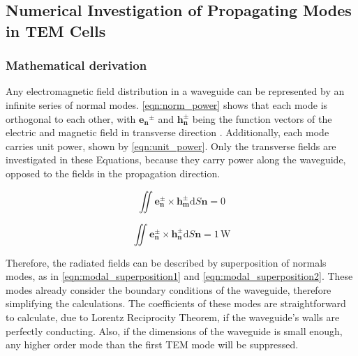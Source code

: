 \subsection{Numerical Investigation of Propagating Modes in TEM Cells}\label{sec:modes_tem_cell}
\subsubsection{Mathematical derivation}



Any electromagnetic field distribution in a waveguide can be represented by an infinite series of normal modes. \autoref{eqn:norm_power} shows that each mode is orthogonal to each other, with $\mathbf{e_n}^\pm$ and $\mathbf{h_n^\pm}$ being the function vectors of the electric and magnetic field in transverse direction \cite{Collin_2015}. Additionally, each mode carries unit power, shown by \autoref{eqn:unit_power}. Only the transverse fields are investigated in these Equations, because they carry power along the waveguide, opposed to the fields in the propagation direction.

\begin{equation}
    \iint \mathbf{e_n^\pm}\times \mathbf{h_m^\pm}\mathrm{d}S\mathbf{n}=0
    \label{eqn:norm_power}
\end{equation}

\begin{equation}
    \iint \mathbf{e_n^\pm}\times \mathbf{h_n^\pm}\mathrm{d}S\mathbf{n}=1\,\mathrm{W}
    \label{eqn:unit_power}
\end{equation}

Therefore, the radiated fields can be described by superposition of normals modes, as in \autoref{eqn:modal_superposition1} and \autoref{eqn:modal_superposition2}. These modes already consider the boundary conditions of the waveguide, therefore simplifying the calculations. The coefficients of these modes are straightforward to calculate, due to Lorentz Reciprocity Theorem, if the waveguide's walls are perfectly conducting. Also, if the dimensions of the waveguide is small enough, any higher order mode than the first TEM mode will be suppressed. 

